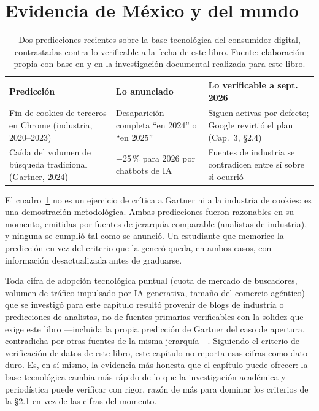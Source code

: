 \section{Evidencia de México y del mundo}

\begin{table}[!htb]
\centering
\begin{tabular}{@{}p{3.3cm}p{4.6cm}p{4.1cm}@{}}
\toprule
Predicción & Lo anunciado & Lo verificable a sept. 2026 \\
\midrule
Fin de cookies de terceros en Chrome (industria, 2020--2023) & Desaparición completa \enquote{en 2024} o \enquote{en 2025} & Siguen activas por defecto; Google revirtió el plan (Cap.~3, §2.4) \\
Caída del volumen de búsqueda tradicional (Gartner, 2024) & $-$25\,\% para 2026 por chatbots de IA & Fuentes de industria se contradicen entre sí sobre si ocurrió \\
\bottomrule
\end{tabular}
\caption{Dos predicciones recientes sobre la base tecnológica del
consumidor digital, contrastadas contra lo verificable a la fecha de este
libro. Fuente: elaboración propia con base en
\parencite{eprs2025darkpatterns} y en la investigación documental realizada
para este libro.}
\label{tab:cap04-predicciones}
\end{table}

El cuadro~\ref{tab:cap04-predicciones} no es un ejercicio de crítica a
Gartner ni a la industria de cookies: es una demostración metodológica. Ambas
predicciones fueron razonables en su momento, emitidas por fuentes de
jerarquía comparable (analistas de industria), y
ninguna se cumplió tal como se anunció. Un estudiante que memorice la
predicción en vez del criterio que la generó queda, en ambos casos, con
información desactualizada antes de graduarse.

Toda cifra de adopción tecnológica puntual (cuota de mercado de buscadores,
volumen de tráfico impulsado por IA generativa, tamaño del comercio
agéntico) que se investigó para este capítulo resultó provenir de blogs de
industria o predicciones de analistas, no de fuentes primarias verificables
con la solidez que exige este libro —incluida la propia predicción de
Gartner del caso de apertura, contradicha por otras fuentes de la misma
jerarquía—. Siguiendo el criterio de verificación de datos de este libro,
este capítulo no reporta esas cifras como dato duro. Es, en sí mismo, la
evidencia más honesta que el capítulo
puede ofrecer: la base tecnológica cambia más rápido de lo que la
investigación académica y periodística puede verificar con rigor, razón de
más para dominar los criterios de la §2.1 en vez de las cifras del momento.

